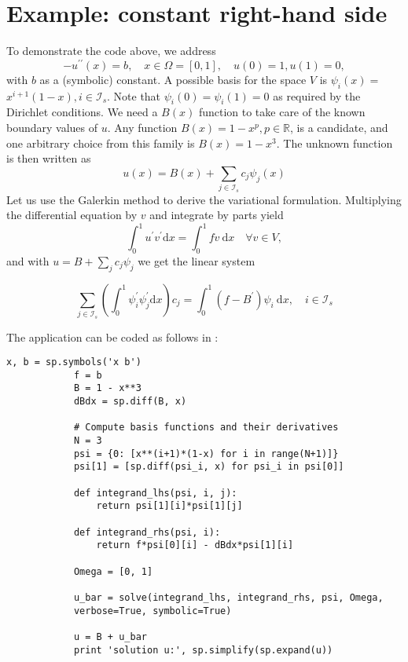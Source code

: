 \documentclass[../main.tex]{subfiles}
\begin{document}
	\section[Example: constant right-hand side]{Example: constant right-hand side}
		\label{sec:sec_16_2}
		\noindent To demonstrate the code above, we address
		$$
		-u^{\prime \prime}(x)=b, \quad x \in \Omega=[0,1], \quad u(0)=1, u(1)=0,
		$$
		with $b$ as a (symbolic) constant. A possible basis for the space $V$ is $\psi_{i}(x)=$ $x^{i+1}(1-x), i \in \mathcal{I}_{s}$. Note that $\psi_{i}(0)=\psi_{i}(1)=0$ as required by the Dirichlet conditions. We need a $B(x)$ function to take care of the known boundary values of $u$. Any function $B(x)=1-x^{p}, p \in \mathbb{R}$, is a candidate, and one arbitrary choice from this family is $B(x)=1-x^{3}$. The unknown function is then written as
		$$
		u(x)=B(x)+\sum_{j \in \mathcal{I}_{s}} c_{j} \psi_{j}(x)
		$$\smallbreak
		Let us use the Galerkin method to derive the variational formulation. Multiplying the differential equation by $v$ and integrate by parts yield
		$$
		\int_{0}^{1} u^{\prime} v^{\prime} \mathrm{d} x=\int_{0}^{1} f v \mathrm{~d} x \quad \forall v \in V,
		$$
		and with $u=B+\sum_{j} c_{j} \psi_{j}$ we get the linear system
		
		\begin{equation}
			\label{eqa196}
			\sum_{j \in \mathcal{I}_{s}}\left(\int_{0}^{1} \psi_{i}^{\prime} \psi_{j}^{\prime} \mathrm{d} x\right) c_{j}=\int_{0}^{1}\left(f-B^{\prime}\right) \psi_{i} \mathrm{~d} x, \quad i \in \mathcal{I}_{s}
		\end{equation}
		
		The application can be coded as follows in :
		
		\begin{lstlisting}[numbers=none]
			x, b = sp.symbols('x b')
			f = b
			B = 1 - x**3
			dBdx = sp.diff(B, x)
			
			# Compute basis functions and their derivatives
			N = 3
			psi = {0: [x**(i+1)*(1-x) for i in range(N+1)]}
			psi[1] = [sp.diff(psi_i, x) for psi_i in psi[0]]
			
			def integrand_lhs(psi, i, j):
				return psi[1][i]*psi[1][j]
				
			def integrand_rhs(psi, i):
				return f*psi[0][i] - dBdx*psi[1][i]
				
			Omega = [0, 1]
			
			u_bar = solve(integrand_lhs, integrand_rhs, psi, Omega,
			verbose=True, symbolic=True)
			
			u = B + u_bar
			print 'solution u:', sp.simplify(sp.expand(u))
		\end{lstlisting}
	
\end{document}
